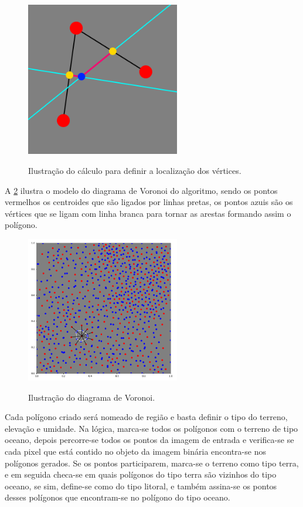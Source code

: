 \begin{figure}[!ht]
	\centering
    \caption{Ilustração do cálculo para definir a localização dos vértices.}
	\includegraphics[width=0.6\textwidth]{figures/explicacao_vertice.png}
	\label{fig:explicacao_vertice}
\end{figure}

A \cref{fig:diagrama_voronoi_pontos} ilustra o modelo do diagrama de Voronoi do algoritmo, sendo os pontos vermelhos os centroides que são ligados por linhas pretas, os pontos azuis são os vértices que se ligam com linha branca para tornar as arestas formando assim o polígono.

\begin{figure}[!ht]
	\centering
    \caption{Ilustração do diagrama de Voronoi.}
	\includegraphics[width=0.6\textwidth]{figures/diagrama_voronoi_pontos.png}
	\label{fig:diagrama_voronoi_pontos}
\end{figure}

Cada polígono criado será nomeado de região e basta definir o tipo do terreno, elevação e umidade. Na lógica, marca-se todos os polígonos com o terreno de tipo oceano, depois percorre-se todos os pontos da imagem de entrada e verifica-se se cada pixel que está contido no objeto da imagem binária encontra-se nos polígonos gerados. Se os pontos participarem, marca-se o terreno como tipo terra, e em seguida checa-se em quais polígonos do tipo terra são vizinhos do tipo oceano, se sim, define-se como do tipo litoral, e também assina-se os pontos desses polígonos que encontram-se no polígono do tipo oceano.

